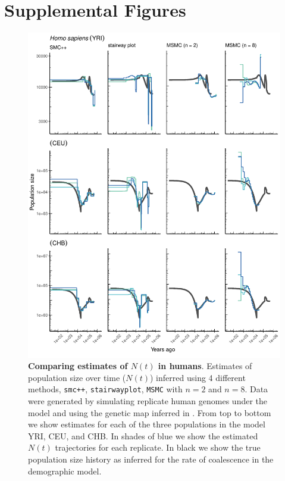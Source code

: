 \documentclass[12pt,halfline,a4paper]{ouparticle}
\newcommand{\MSMC}{\texttt{MSMC}\xspace}
\newcommand{\smcpp}{\texttt{smc++}\xspace}
\newcommand{\stairwayplot}{\texttt{stairwayplot}\xspace}
\begin{document}
\section*{Supplemental Figures}
\begin{figure}
\begin{center}
\includegraphics[width=0.8\linewidth]{display_items/homo_sapiens_mask_Gutenkunst.pdf}
\caption{\textbf{Comparing estimates of $N(t)$ in humans}. Estimates of population
size over time ($N(t)$) inferred using 4 different methods, \smcpp, \stairwayplot,
\MSMC with $n=2$ and $n=8$. Data were generated by simulating
replicate human genomes under the \cite{gutenkunst2009inferring} model and using the genetic map
inferred in \cite{international2007second}. From top to bottom we show estimates for each
of the three populations in the model YRI, CEU, and CHB. In shades of blue we show the estimated
$N(t)$ trajectories for each replicate. In black we show the true population size history as inferred
for the rate of coalescence in the demographic model.}
\label{fig:n_t_gutenkunst}
\end{center}
\end{figure}
\end{document}
